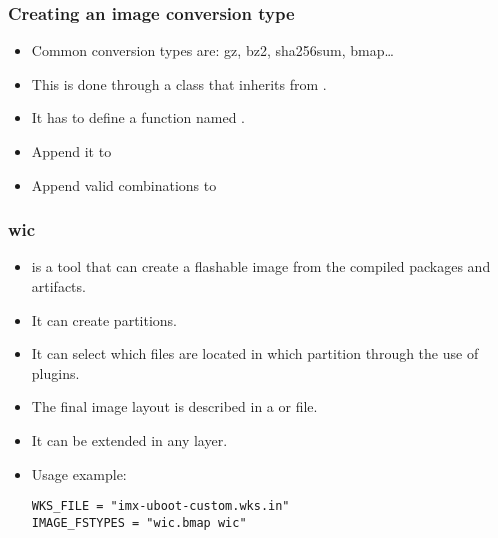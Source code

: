 \begin{frame}
  \frametitle{Creating an image conversion type}
  \begin{itemize}
    \item Common conversion types are: gz, bz2, sha256sum, bmap\dots
    \item This is done through a class that inherits from
      .
    \item It has to define a function named .
    \item Append it to 
    \item Append valid combinations to 
  \end{itemize}
\end{frame}

\begin{frame}[fragile]
  \frametitle{wic}
  \begin{itemize}
    \item {} is a tool that can create a flashable image from
      the compiled packages and artifacts.
    \item It can create partitions.
    \item It can select which files are located in
      which partition through the use of plugins.
    \item The final image layout is described in a  or
       file.
    \item It can be extended in any layer.
    \item Usage example:
      \begin{block}{}
        \begin{verbatim}
WKS_FILE = "imx-uboot-custom.wks.in"
IMAGE_FSTYPES = "wic.bmap wic"
        \end{verbatim}
      \end{block}
  \end{itemize}
\end{frame}

